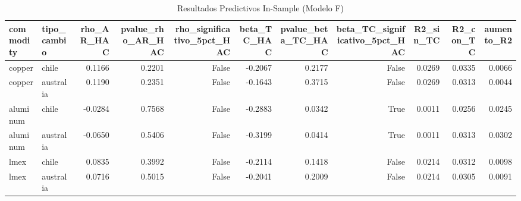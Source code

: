 \begin{table}
\caption{Resultados Predictivos In-Sample (Modelo F)}
\label{tab:res_f}
\begin{tabular}{llrrrrrrrrr}
\toprule
commodity & tipo_cambio & rho_AR_HAC & pvalue_rho_AR_HAC & rho_significativo_5pct_HAC & beta_TC_HAC & pvalue_beta_TC_HAC & beta_TC_significativo_5pct_HAC & R2_sin_TC & R2_con_TC & aumento_R2 \\
\midrule
copper & chile & 0.1166 & 0.2201 & False & -0.2067 & 0.2177 & False & 0.0269 & 0.0335 & 0.0066 \\
copper & australia & 0.1190 & 0.2351 & False & -0.1643 & 0.3715 & False & 0.0269 & 0.0313 & 0.0044 \\
aluminum & chile & -0.0284 & 0.7568 & False & -0.2883 & 0.0342 & True & 0.0011 & 0.0256 & 0.0245 \\
aluminum & australia & -0.0650 & 0.5406 & False & -0.3199 & 0.0414 & True & 0.0011 & 0.0313 & 0.0302 \\
lmex & chile & 0.0835 & 0.3992 & False & -0.2114 & 0.1418 & False & 0.0214 & 0.0312 & 0.0098 \\
lmex & australia & 0.0716 & 0.5015 & False & -0.2041 & 0.2009 & False & 0.0214 & 0.0305 & 0.0091 \\
\bottomrule
\end{tabular}
\end{table}
